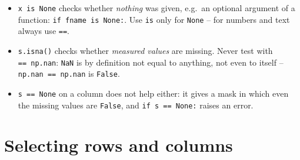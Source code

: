 \documentclass[
  letterpaper,
  DIV=11,
  numbers=noendperiod]{scrreprt}
\providecommand{\tightlist}{%
  \setlength{\itemsep}{0pt}\setlength{\parskip}{0pt}}\usepackage{longtable,booktabs,array}
\begin{document}
\begin{tcolorbox}[enhanced jigsaw, left=2mm, title=\textcolor{quarto-callout-warning-color}{\faExclamationTriangle}\hspace{0.5em}{Pitfall: \texttt{is\ None}, \texttt{isna()} and \texttt{==}}, opacityback=0, breakable, rightrule=.15mm, arc=.35mm, toptitle=1mm, colbacktitle=quarto-callout-warning-color!10!white, opacitybacktitle=0.6, coltitle=black, colframe=quarto-callout-warning-color-frame, bottomrule=.15mm, leftrule=.75mm, bottomtitle=1mm, titlerule=0mm, toprule=.15mm, colback=white]

\begin{itemize}
\tightlist
\item
  \texttt{x\ is\ None} checks whether \emph{nothing} was given, e.g.~an
  optional argument of a function: \texttt{if\ fname\ is\ None:}. Use
  \texttt{is} only for \texttt{None} -- for numbers and text always use
  \texttt{==}.
\item
  \texttt{s.isna()} checks whether \emph{measured values} are missing.
  Never test with \texttt{==\ np.nan}: \texttt{NaN} is by definition not
  equal to anything, not even to itself -- \texttt{np.nan\ ==\ np.nan}
  is \texttt{False}.
\item
  \texttt{s\ ==\ None} on a column does not help either: it gives a mask
  in which even the missing values are \texttt{False}, and
  \texttt{if\ s\ ==\ None:} raises an error.
\end{itemize}

\end{tcolorbox}

\section{Selecting rows and columns}\label{selecting-rows-and-columns-1}
\end{document}
